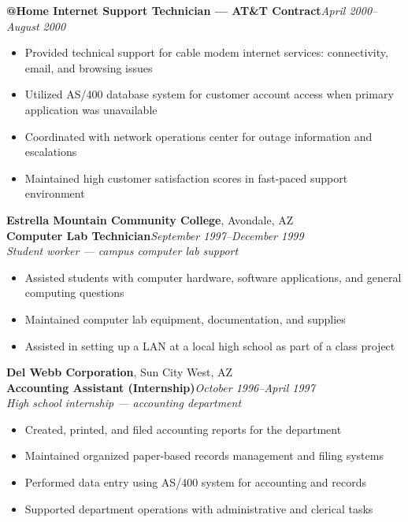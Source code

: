 \documentclass[9pt,letterpaper]{extarticle}
\begin{document}
\textbf{@Home Internet Support Technician --- AT\&T Contract}\hfill\textit{April 2000--August 2000}
\begin{itemize}
  \item Provided technical support for cable modem internet services: connectivity, email, and browsing issues
  \item Utilized AS/400 database system for customer account access when primary application was unavailable
  \item Coordinated with network operations center for outage information and escalations
  \item Maintained high customer satisfaction scores in fast-paced support environment
\end{itemize}

\vspace{5pt}
\noindent\textbf{Estrella Mountain Community College}, Avondale, AZ\\
\textbf{Computer Lab Technician}\hfill\textit{September 1997--December 1999}\\
\textit{Student worker --- campus computer lab support}
\begin{itemize}
  \item Assisted students with computer hardware, software applications, and general computing questions
  \item Maintained computer lab equipment, documentation, and supplies
  \item Assisted in setting up a LAN at a local high school as part of a class project
\end{itemize}

\newpage
\noindent\textbf{Del Webb Corporation}, Sun City West, AZ\\
\textbf{Accounting Assistant (Internship)}\hfill\textit{October 1996--April 1997}\\
\textit{High school internship --- accounting department}
\nopagebreak
\begin{itemize}
  \item Created, printed, and filed accounting reports for the department
  \item Maintained organized paper-based records management and filing systems
  \item Performed data entry using AS/400 system for accounting and records
  \item Supported department operations with administrative and clerical tasks
\end{itemize}
\end{document}
